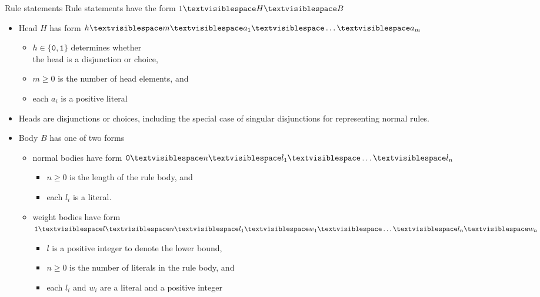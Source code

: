 \begin{frame}{Rule statements}
  \newcommand\Space{\textvisiblespace}
  Rule statements have the form
  \hfill \(1 \Space H \Space B\)\qquad\qquad
  \begin{itemize}
  \item<2-> Head $H$ has form
    \hfill\(h \Space m \Space a_1 \Space \dots \Space a_m\)\qquad\qquad
    \begin{itemize}
    \item $h \in \{\texttt{0},\texttt{1}\}$ determines whether\\ the head is a disjunction or choice,
    \item $m \geq 0$ is the number of head elements, and
    \item each $a_i$ is a positive literal
    \end{itemize}
  \item<2->[] Heads are disjunctions or choices, including the special case of singular disjunctions for representing normal rules.
  \item<3-> Body $B$ has one of two forms
    \begin{itemize}
    \item normal bodies have form
      \hfill\(\texttt{0} \Space n \Space l_{1} \Space \dots \Space l_n\)\qquad\qquad
      \begin{itemize}
      \item $n \geq 0$ is the length of the rule body, and
      \item each $l_i$ is a literal.
      \end{itemize}
    \item weight bodies have form
      \hfill\(\texttt{1} \Space l \Space n \Space l_1 \Space w_1  \Space \dots \Space l_n \Space w_n\)\qquad\qquad
      \begin{itemize}
      \item $l$ is a positive integer to denote the lower bound,
      \item $n \geq 0$ is the number of literals in the rule body, and
      \item each $l_i$ and $w_i$ are a literal and a positive integer
      \end{itemize}
    \end{itemize}
  \end{itemize}
\end{frame}
